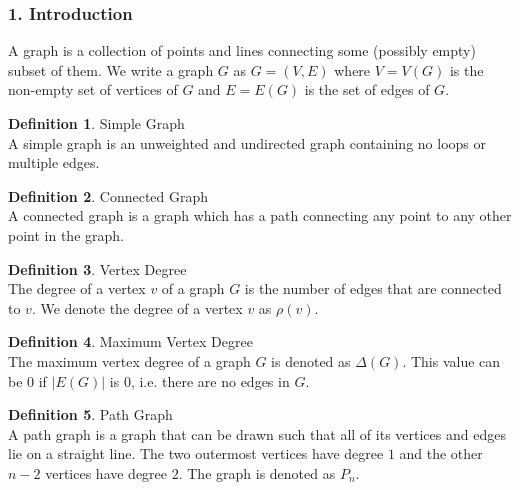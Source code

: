 \documentclass[12pt, a4paper]{report}
\newlength\tindent
\renewcommand{\indent}{\hspace*{\tindent}}
\theoremstyle{definition}
\newtheorem{definition}{Definition}
\theoremstyle{definition}
\theoremstyle{remark}
\theoremstyle{definition}
\theoremstyle{definition}
\begin{document}
\subsubsection*{1. Introduction}
\indent A graph is a collection of points and lines connecting some (possibly empty) subset of them. We write a graph $G$ as $G=(V,E)$ where $V=V(G)$ is the non-empty set of vertices of $G$ and $E=E(G)$ is the set of edges of $G$.

\begin{definition}{Simple Graph}
\\\indent A simple graph is an unweighted and undirected graph containing no loops or multiple edges.
\end{definition}

\begin{definition}{Connected Graph}
\\\indent A connected graph is a graph which has a path connecting any point to any other point in the graph.
\end{definition}

\begin{definition}{Vertex Degree}
\\\indent The degree of a vertex $v$ of a graph $G$ is the number of edges that are connected to $v$. We denote the degree of a vertex $v$ as $\rho(v)$.
\end{definition}

\begin{definition}{Maximum Vertex Degree}
\\\indent The maximum vertex degree of a graph $G$ is denoted as $\Delta(G)$. This value can be $0$ if $|E(G)|$ is $0$, i.e. there are no edges in $G$.
\end{definition}

\begin{definition}{Path Graph}
\\\indent A path graph is a graph that can be drawn such that all of its vertices and edges lie on a straight line. The two outermost vertices have degree $1$ and the other $n-2$ vertices have degree $2$. The graph is denoted as $P_n$.
\end{definition}

\newpage
\end{document}
